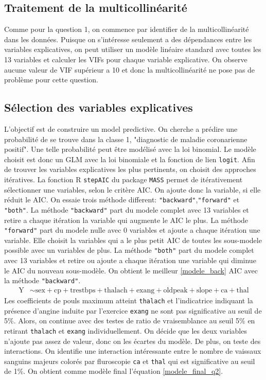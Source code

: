 \documentclass{article}
\begin{document}
	\subsection{Traitement de la multicollinéarité}
	
	Comme pour la question 1, on commence par identifier de la multicollinéarité dans les données. Puisque on s'intéresse seulement a des dépendances entre les variables explicatives, on peut utiliser un modèle linéaire standard avec toutes les 13 variables et calculer les VIFs pour chaque variable explicative. On observe aucune valeur de VIF supérieur a 10 et donc la multicollinéarité ne pose pas de problème pour cette question.
	


	\subsection{Sélection des variables explicatives}
	L'objectif est de construire un model predictive. On cherche a prédire une probabilité de se trouve dans la classe 1, "diagnostic de maladie coronarienne positif". Une telle probabilité  peut être modélisé avec la loi binomial. Le modèle choisit est donc un GLM avec la loi binomiale et la fonction de lien \texttt{logit}. 
	Afin de trouver les variables explicatives les plus pertinents, on choisit des approches itératives. La fonction R \texttt{stepAIC} du package \texttt{MASS} permet de itérativement sélectionner une variables, selon le critère AIC. On ajoute donc la variable, si elle réduit le AIC. On essaie trois méthode different: \texttt{"backward"},\texttt{"forward"} et \texttt{"both"}. La méthode \texttt{"backward"} part du modele complet avec 13 variables et retire a chaque itération la variable qui augmente le AIC le plus. La méthode \texttt{"forward"} part du modele nulle avec 0 variables et ajoute a chaque itération une variable. Elle choisit la variables qui a le plus petit AIC de toutes les sous-modele possible avec un variables de plus. La méthode \texttt{"both"} part du modele complet avec 13 variables et retire ou ajoute a chaque itération une variable qui diminue le AIC du nouveau sous-modèle. On obtient le meilleur \eqref{modele_back} AIC avec la méthode \texttt{"backward"}. 	
	\begin{align}\label{modele_back}
	\mathrm{Y} &\sim \mathrm{sex + cp + trestbps + thalach + exang + oldpeak + 
		slope + ca + thal}
	\end{align}
	Les coefficients de pouls maximum atteint \texttt{thalach} et l'indicatrice indiquant la présence d’angine induite par l’exercice \texttt{exang} ne sont pas significative au seuil de 5\%. Alors, on continue avec des testes de ratio de vraisemblance au seuil 5\% en retirant \texttt{thalach} et \texttt{exang} individuellement. On décide que les deux variables n'ajoute pas assez de valeur, donc on les écartes du modèle. De plus, on teste des interactions. On identifie une interaction intéressante entre le nombre de vaissaux sanguins majeurs colorés par fluroscopie \texttt{ca} et \texttt{thal} qui est significative au seuil de 1\%. On obtient comme modèle final l'équation \eqref{modele_final_q2}.
\end{document}
